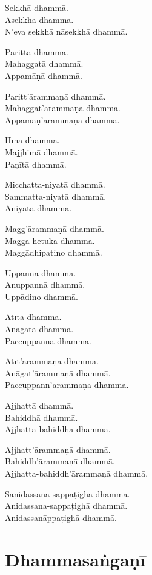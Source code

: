 Sekkhā dhammā.\\
Asekkhā dhammā.\\
N'eva sekkhā nāsekkhā dhammā.

Parittā dhammā.\\
Mahaggatā dhammā.\\
Appamāṇā dhammā.

\clearpage

Paritt'ārammaṇā dhammā.\\
Mahaggat'ārammaṇā dhammā.\\
Appamāṇ'ārammaṇā dhammā.

Hīnā dhammā.\\
Majjhimā dhammā.\\
Paṇītā dhammā.

Micchatta-niyatā dhammā.\\
Sammatta-niyatā dhammā.\\
Aniyatā dhammā.

Magg'ārammaṇā dhammā.\\
Magga-hetukā dhammā.\\
Maggādhipatino dhammā.

Uppannā dhammā.\\
Anuppannā dhammā.\\
Uppādino dhammā.

Atītā dhammā.\\
Anāgatā dhammā.\\
Paccuppannā dhammā.

Atīt'ārammaṇā dhammā.\\
Anāgat'ārammaṇā dhammā.\\
Paccuppann'ārammaṇā dhammā.

\clearpage

Ajjhattā dhammā.\\
Bahiddhā dhammā.\\
Ajjhatta-bahiddhā dhammā.

Ajjhatt'ārammaṇā dhammā.\\
Bahiddh'ārammaṇā dhammā.\\
Ajjhatta-bahiddh'ārammaṇā dhammā.

Sanidassana-sappaṭighā dhammā.\\
Anidassana-sappaṭighā dhammā.\\
Anidassanāppaṭighā dhammā. 

\section{Dhammasaṅgaṇī}

